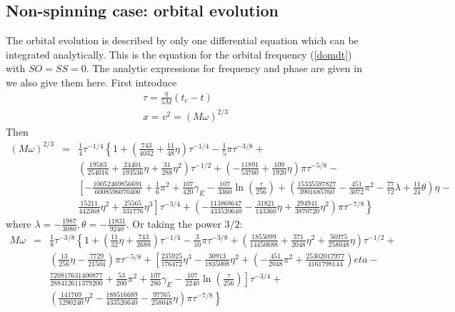 \documentclass[11pt]{report}
\def\bea{\begin{eqnarray}}
\def\ena{\end{eqnarray}}
\begin{document}
\subsection{Non-spinning case: orbital evolution}

The orbital evolution is described by only one differential equation which can
be integrated analytically. This is the equation for the orbital frequency
(\ref{domdt}) with $SO=SS=0$. 
The analytic expressions for frequency and phase are given in \cite{Blanchet}
we also give them here. First introduce 
\bea
\tau = \frac{\eta}{5M}(t_c - t)\\
x = v^2 = (M\omega)^{2/3}
\ena
Then 
\bea
(M\omega)^{2/3} &=& \frac1{4}\tau^{-1/4}\left\{ 1 + \left(\frac{743}{4032} + \frac{11}{48}\eta\right)
\tau^{-1/4} - \frac1{5}\pi \tau^{-3/8} + \right.\nonumber \\
& &\left. \left( \frac{19583}{254016} + \frac{24401}{193536}\eta + \frac{31}{288}\eta^2\right)
\tau^{-1/2} + \left(-\frac{11891}{53760} + \frac{109}{1920}\eta\right)\pi \tau^{-5/8} -
\right. \nonumber \\
& & \left. \left[ -\frac{10052469856691}{6008596070400} + \frac1{6}\pi^2 + 
\frac{107}{420}\gamma_E - \frac{107}{3360}\ln\left(\frac{\tau}{256}\right) 
+ \left(\frac{15335597827}{3901685760} - \frac{451}{3072}\pi^2 - 
\frac{77}{72}\lambda + \frac{11}{24}\theta \right)\eta - \right. \right. \nonumber \\
& & \left. \left. \frac{15211}{442368}\eta^2 + \frac{25565}{331776}\eta^3 \right]
\tau^{-3/4} + \left(-\frac{113868647}{433520640} - \frac{31821}{143360}\eta + 
\frac{294941}{3870720}\eta^2\right)\pi\tau^{-7/8}  \right\}
\ena
where $\lambda = -\frac{1987}{3080}, \theta=-\frac{11831}{9240}$.
Or taking the power $3/2$:
\bea
M\omega &=& \frac1{8} \tau^{-3/8}\left\{ 1 + \left( \frac{11}{32}\eta + \frac{743}{2688}\right) 
\tau^{-1/4} - \frac{3}{10}\pi\tau^{-3/8} 
+ \left(\frac{1855099}{14450688} + \frac{371}{2048}\eta^2 + \frac{56975}{258048}\eta\right)
\tau^{-1/2} + \right. \nonumber \\
& &\left.\left( \frac{13}{256}\eta- \frac{7729}{21504}\right)\pi \tau^{-5/8} +
\left[ \frac{235925}{176472}\eta^3 - \frac{30913}{1835008}\eta^2 + \left(-\frac{451}{2048} \pi^2+ 
\frac{25302017977}{4161798144}\right) eta -\right. \right. \nonumber \\
& & \left. \left.
\frac{720817631400877}{288412611379200} + \frac{53}{200}\pi^2 + \frac{107}{280}\gamma_E - 
\frac{107}{2240}\ln\left(\frac{\tau}{256}\right) \right]\tau^{-3/4} +
\right. \nonumber \\
& & \left. \left(\frac{141769}{1290240}\eta^2- \frac{188516689}{433520640} -\frac{97765}{258048}\eta\right) 
\pi\tau^{-7/8}
\right\}
\label{omNosp}
\ena
\end{document}
